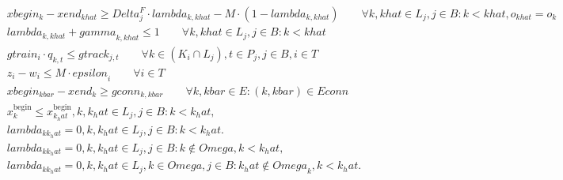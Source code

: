 \begin{align}
  & xbegin_{k} - xend_{khat} \geq \mathit{Delta}_{j}^{F} \cdot \mathit{lambda}_{k,khat} - M \cdot (1 - \mathit{lambda}_{k,khat}) \qquad \forall k, khat \in L_{j}, j \in B : k < khat, o_{khat} = o_{k} \tag{eq\_0015} \\
  & \mathit{lambda}_{k,khat} + \mathit{gamma}_{k,khat} \leq 1 \qquad \forall k, khat \in L_{j}, j \in B : k < khat \tag{eq\_0016} \\
  & gtrain_{i} \cdot q_{k,t} \leq gtrack_{j,t} \qquad \forall k \in (K_{i} \cap L_{j}), t \in P_{j}, j \in B, i \in T \tag{eq\_0017} \\
  & z_{i} - w_{i} \leq M \cdot \mathit{epsilon}_{i} \qquad \forall i \in T \tag{eq\_0018} \\
  & xbegin_{kbar} - xend_{k} \geq gconn_{k,kbar} \qquad \forall k, kbar \in E : (k, kbar) \in Econn \tag{eq\_0019} \\
  & x_{k}^{\text{begin}} \leq x_{k_hat}^{\text{begin}} , k , k_hat \in L_{j} , j \in B : k < k_hat , \tag{eq\_0024} \\
  & \mathit{lambda}_{k k_hat} = 0 , k , k_hat \in L_{j} , j \in B : k < k_hat . \tag{eq\_0025} \\
  & \mathit{lambda}_{k k_hat} = 0 , k , k_hat \in L_{j} , j \in B : k \notin \mathit{Omega} , k < k_hat , \tag{eq\_0026} \\
  & \mathit{lambda}_{k k_hat} = 0 , k , k_hat \in L_{j} , k \in \mathit{Omega} , j \in B : k_hat \notin \mathit{Omega}_{k} , k < k_hat . \tag{eq\_0027} \\
\end{align}
